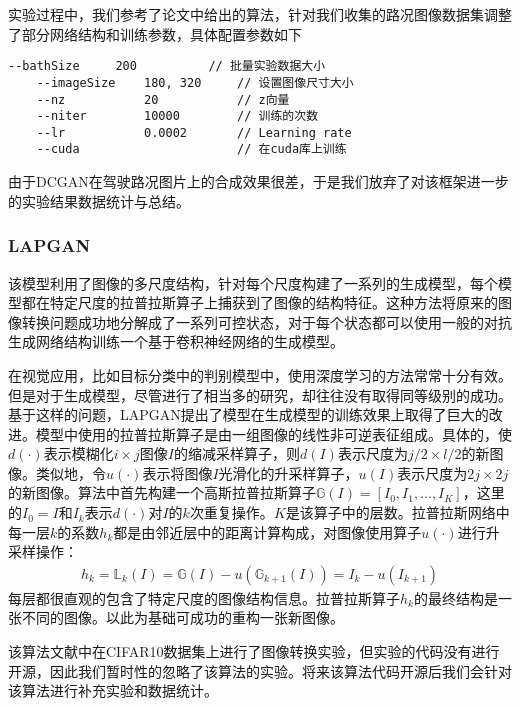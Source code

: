 实验过程中，我们参考了\cite{dcgan}论文中给出的算法，针对我们收集的路况图像数据集调整了部分网络结构和训练参数，具体配置参数如下

\begin{lstlisting}[basicstyle=\small]
    --bathSize     200          // 批量实验数据大小
    --imageSize    180, 320     // 设置图像尺寸大小
    --nz           20           // z向量
    --niter        10000        // 训练的次数
    --lr           0.0002       // Learning rate
    --cuda                      // 在cuda库上训练
\end{lstlisting}

由于DCGAN在驾驶路况图片上的合成效果很差，于是我们放弃了对该框架进一步的实验结果数据统计与总结。

\subsubsection{LAPGAN}

 该模型利用了图像的多尺度结构，针对每个尺度构建了一系列的生成模型，每个模型都在特定尺度的拉普拉斯算子\cite{lapcode}上捕获到了图像的结构特征。这种方法将原来的图像转换问题成功地分解成了一系列可控状态，对于每个状态都可以使用一般的对抗生成网络结构训练一个基于卷积神经网络的生成模型。

在视觉应用，比如目标分类中的判别模型中，使用深度学习的方法常常十分有效。但是对于生成模型，尽管进行了相当多的研究\cite{lapgan1}\cite{lapgan2}\cite{lapgan3}，却往往没有取得同等级别的成功。基于这样的问题，LAPGAN提出了模型在生成模型的训练效果上取得了巨大的改进。模型中使用的拉普拉斯算子是由一组图像的线性非可逆表征组成。具体的，使$d(\cdot)$表示模糊化$i\times j$图像$I$的缩减采样算子，则$d(I)$表示尺度为$j/2\times l/2$的新图像。类似地，令$u(\cdot)$表示将图像$I$光滑化的升采样算子，$u(I)$表示尺度为$2j\times 2j$的新图像。算法中首先构建一个高斯拉普拉斯算子$\mathbb{G}(I)=[I_0,I_1,\dots,I_K]$，这里的$I_0=I$和$I_k$表示$d(\cdot)$对$I$的$k$次重复操作。$K$是该算子中的层数。拉普拉斯网络中每一层$k$的系数$h_k$都是由邻近层中的距离计算构成，对图像使用算子$u(\cdot)$进行升采样操作：
\begin{gather}
    h_k=\mathbb{L}_k(I)=\mathbb{G}(I)-u(\mathbb{G}_{k+1}(I))=I_k-u(I_{k+1})
\end{gather}
每层都很直观的包含了特定尺度的图像结构信息。拉普拉斯算子$h_k$的最终结构是一张不同的图像。以此为基础可成功的重构一张新图像。

该算法文献\cite{LAPGAN}中在CIFAR10数据集上进行了图像转换实验，但实验的代码没有进行开源，因此我们暂时性的忽略了该算法的实验。将来该算法代码开源后我们会针对该算法进行补充实验和数据统计。 

